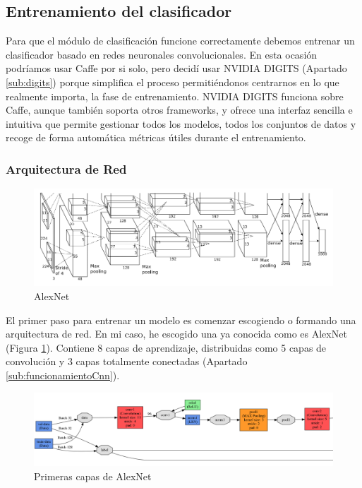\documentclass[a4paper,11pt]{book}
\begin{document}
\subsection{Entrenamiento del clasificador}
Para que el módulo de clasificación funcione correctamente debemos entrenar un clasificador basado en redes neuronales convolucionales. En esta ocasión podríamos usar Caffe por si solo, pero decidí usar NVIDIA DIGITS (Apartado \ref{sub:digits}) porque simplifica el proceso permitiéndonos centrarnos en lo que realmente importa, la fase de entrenamiento. NVIDIA DIGITS funciona sobre Caffe, aunque también soporta otros frameworks, y ofrece una interfaz sencilla e intuitiva que permite gestionar todos los modelos, todos los conjuntos de datos y recoge de forma automática métricas útiles durante el entrenamiento.

\subsubsection{Arquitectura de Red}

\begin{figure}[h]
\centering
\includegraphics[width=1\linewidth]{imagenes/alexNet}
\caption[AlexNet]{AlexNet\cite{krizhevsky12}}
\label{fig:alexNet}
\end{figure}
El primer paso para entrenar un modelo es comenzar escogiendo o formando una arquitectura de red. En mi caso, he escogido una ya conocida como es AlexNet\cite{krizhevsky12} (Figura \ref{fig:alexNet}).
Contiene 8 capas de aprendizaje, distribuidas como 5 capas de convolución y 3 capas totalmente conectadas (Apartado \ref{sub:funcionamientoCnn}).\\

\begin{figure}[h]
\centering
\includegraphics[width=1\linewidth]{imagenes/alexNet1}
\caption[AlexNet input]{Primeras capas de AlexNet}
\label{fig:alexNet1}
\end{figure}
\end{document}
